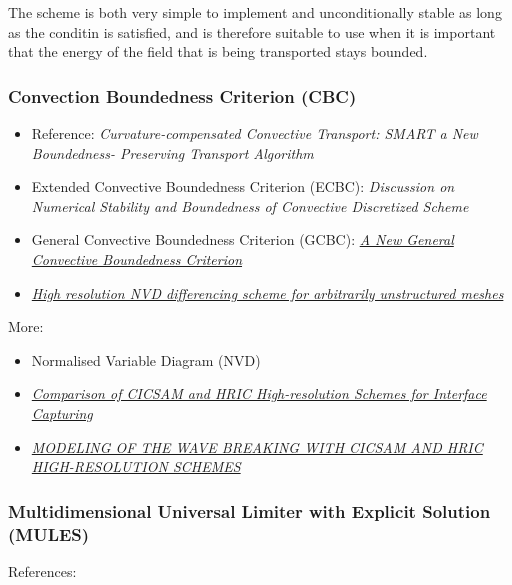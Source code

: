 The \UPWIND scheme is both very simple to implement and unconditionally stable as long as the \CFL conditin is satisfied, and is therefore suitable to use when it is important that the energy of the field that is being transported stays bounded. 

\subsubsection{Convection Boundedness Criterion (CBC)}

\begin{itemize}
    \item Reference: \textit{Curvature-compensated Convective Transport: SMART a New Boundedness- Preserving Transport Algorithm}
    \item Extended Convective Boundedness Criterion (ECBC): \textit{Discussion on Numerical Stability and Boundedness of Convective Discretized Scheme}
    \item General Convective Boundedness Criterion (GCBC): \textit{\href{http://gr.xjtu.edu.cn:8080/upload/PUB.1673.4/Wei_NHT.pdf}{A New General Convective Boundedness Criterion}}
    \item {} \textit{\href{http://powerlab.fsb.hr/ped/kturbo/openfoam/papers/GammaPaper.pdf}{High resolution NVD differencing scheme for arbitrarily unstructured meshes}}
\end{itemize}

More:
\begin{itemize}
    \item Normalised Variable Diagram (NVD)
    \item \textit{\href{http://warminski.pollub.plwww.ptmts.org.pl/Waclaw-Koron-2-08.pdf}{Comparison of CICSAM and HRIC High-resolution Schemes for Interface Capturing}}
    \item \textit{\href{http://proceedings.fyper.com/eccomascfd2006/documents/85.pdf}{MODELING OF THE WAVE BREAKING WITH CICSAM AND HRIC HIGH-RESOLUTION SCHEMES}}
\end{itemize}

\subsubsection{Multidimensional Universal Limiter with Explicit Solution (MULES)}

References: \citep{Berberovi2009,Kissling2010}

